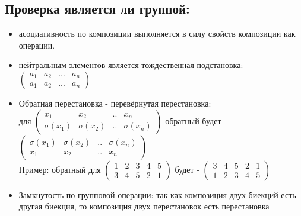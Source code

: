 \documentclass[12pt]{article}
\begin{document}
\subsection{Проверка является ли группой:}
\begin{itemize}
    \item асоциативность по композиции выполняется в силу свойств композиции как операции.
    \item нейтральным элементов является тождественная подстановка:
          $\begin{pmatrix}
                  a_1 & a_2 & ... & a_n \\
                  a_1 & a_2 & ... & a_n
              \end{pmatrix}$
    \item Обратная перестановка - перевёрнутая перестановка:\\для     $\begin{pmatrix}
                  x_1         & x_2         & .. & x_n         \\
                  \sigma(x_1) & \sigma(x_2) & .. & \sigma(x_n)
              \end{pmatrix}$
          обратный будет -
          $\begin{pmatrix}
                  \sigma(x_1) & \sigma(x_2) & .. & \sigma(x_n) \\
                  x_1         & x_2         & .. & x_n
              \end{pmatrix}$\\
          Пример: обратный для $\begin{pmatrix}
                  1 & 2 & 3 & 4 & 5 \\
                  3 & 4 & 5 & 2 & 1
              \end{pmatrix}$
          будет - $\begin{pmatrix}
                  3 & 4 & 5 & 2 & 1 \\
                  1 & 2 & 3 & 4 & 5
              \end{pmatrix}$
    \item Замкнутость по групповой операции: так как композиция двух биекций есть другая биекция, то композиция двух перестановок есть перестановка
\end{itemize}
\end{document}
